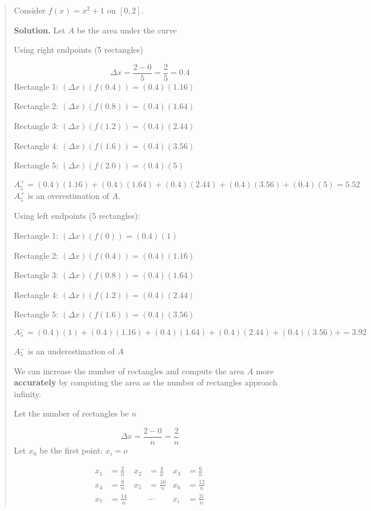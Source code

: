 \documentclass[
]{article}
\begin{document}
\begin{quote}
Consider \(f(x) = x^2 +1\) on \([0,2]\).

\textbf{Solution.} Let \(A\) be the area under the curve

Using right endpoints (5 rectangles)

\[ \Delta x = \frac{2-0}{5} = \frac{2}{5} = 0.4 \] Rectangle 1:
\((\Delta x)(f(0.4)) = (0.4)(1.16)\)

Rectangle 2: \((\Delta x)(f(0.8)) = (0.4)(1.64)\)

Rectangle 3: \((\Delta x)(f(1.2)) = (0.4)(2.44)\)

Rectangle 4: \((\Delta x)(f(1.6)) = (0.4)(3.56)\)

Rectangle 5: \((\Delta x)(f(2.0)) = (0.4)(5)\)

\[ A_5^+ = (0.4)(1.16) + (0.4)(1.64) + (0.4)(2.44) + (0.4)(3.56) +(0.4)(5) = 5.52 \]
\(A_5^+\) is an overestimation of \(A\).

Using left endpoints (5 rectangles):

Rectangle 1: \((\Delta x)(f(0)) = (0.4)(1)\)

Rectangle 2: \((\Delta x)(f(0.4)) = (0.4)(1.16)\)

Rectangle 3: \((\Delta x)(f(0.8)) = (0.4)(1.64)\)

Rectangle 4: \((\Delta x)(f(1.2)) = (0.4)(2.44)\)

Rectangle 5: \((\Delta x)(f(1.6)) = (0.4)(3.56)\)

\[ A_5^- = (0.4)(1) + (0.4)(1.16) + (0.4)(1.64) + (0.4)(2.44) + (0.4)(3.56) + =3.92 \]

\(A_5^-\) is an underestimation of \(A\)

We can increase the number of rectangles and compute the area \(A\) more
\textbf{accurately} by computing the area as the number of rectangles
approach infinity.

Let the number of rectangles be \(n\)

\[ \Delta x = \frac{2-0}{n}=\frac{2}{n} \] Let \(x_0\) be the first
point: \(x_i=o\)

\begin{align*}
x_1 &= \frac{2}{n} & x_2 &= \frac{4}{n} & x_3 &= \frac{6}{n}\\
x_4 &= \frac{8}{n} & x_5 &= \frac{10}{n} & x_6 &= \frac{12}{n}\\
x_7 &= \frac{14}{n} &    &\cdots      & x_i &= \frac{2i}{n}
\end{align*}


\end{quote}
\end{document}
